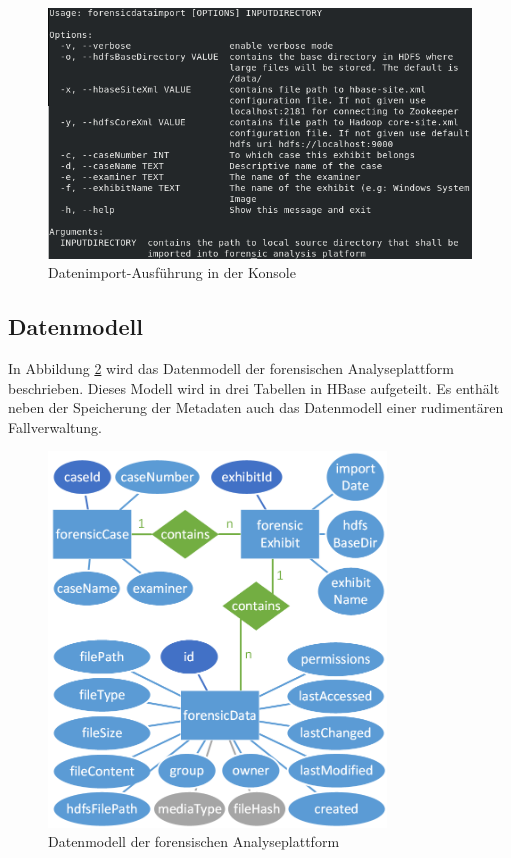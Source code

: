 \begin{figure}[ht]
  \centering
  \includegraphics[width=\textwidth]{./resource/data_import_console_command.png}
  \caption{Datenimport-Ausführung in der Konsole}
  \label{fig:data_import_console_params}
\end{figure} 


\subsection{Datenmodell}
\label{subsec:data_import_data_model}

In Abbildung \ref{fig:hbase_data_model} wird das Datenmodell der forensischen Analyseplattform beschrieben. Dieses Modell wird in drei Tabellen in HBase aufgeteilt. 
Es enthält neben der Speicherung der Metadaten auch das Datenmodell einer rudimentären Fallverwaltung.\\

\begin{figure}[ht]
  \centering
  \includegraphics[width=0.8\textwidth]{./resource/hbase_data_model.png}
  \caption{Datenmodell der forensischen Analyseplattform}
  \label{fig:hbase_data_model}
\end{figure}


